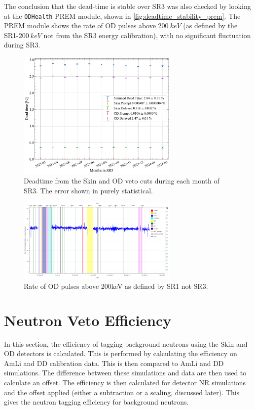 The conclusion that the dead-time is stable over SR3 was also checked by looking at the \lstinline{ODHealth} PREM module, shown in \autoref{fig:deadtime_stability_prem}.
The PREM module shows the rate of OD pulses above $200~keV$ (as defined by the SR1-$200~keV$ not from the SR3 energy calibration), with no significant fluctuation during SR3.
\begin{figure}
	\centering
	\includegraphics[width=0.7\textwidth]{figures/VetoEfficiency/SR3DeadTimeAll_expoFunc.pdf}
	\caption{Deadtime from the Skin and OD veto cuts during each month of SR3. The error shown in purely statistical.}
	\label{fig:deadtime_stability}
\end{figure}
\begin{figure}
	\centering
	\includegraphics[width=0.7\textwidth]{figures/VetoEfficiency/prem_od_stability.png}
	\caption{Rate of OD pulses above 200keV as defined by SR1 not SR3.}
	\label{fig:deadtime_stability_prem}
\end{figure}

\section{Neutron Veto Efficiency \label{sec:efficiency}}
In this section, the efficiency of tagging background neutrons using the Skin and OD detectors is calculated.
This is performed by calculating the efficiency on AmLi and DD calibration data.
This is then compared to AmLi and DD simulations.
The difference between these simulations and data are then used to calculate an offset.
The efficiency is then calculated for detector NR simulations and the offset applied (either a subtraction or a scaling, discussed later).
This gives the neutron tagging efficiency for background neutrons.

